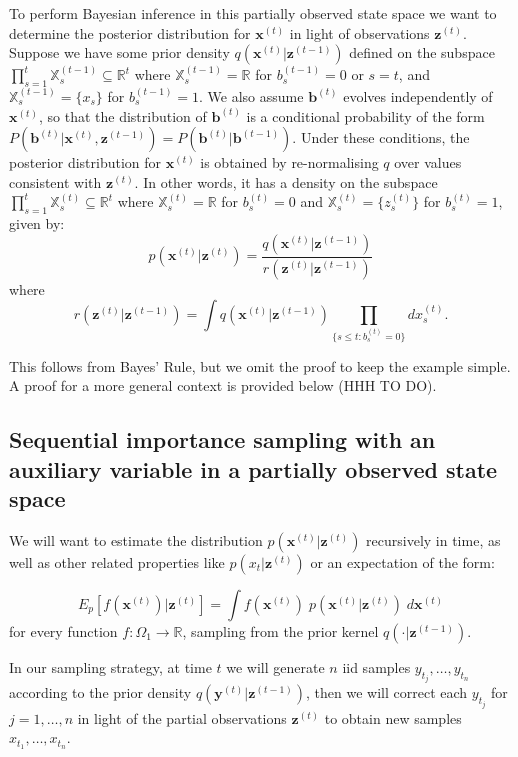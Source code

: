 \documentclass[11pt,a4paper]{article}
\newcommand{\Real}{\mathbb R}
\renewcommand{\vec}[1]{\mathbf{#1}}
\begin{document}
To perform Bayesian inference in this partially observed state space we want to determine the posterior distribution for $\vec{x}^{(t)}$ in light of observations $\vec{z}^{(t)}$. Suppose we have some prior density $q(\vec{x}^{(t)}|\vec{z}^{(t-1)})$ defined on the subspace $\prod_{s=1}^t \mathbb{X}_s^{(t-1)} \subseteq \mathbb{R}^t$ where $\mathbb{X}_s^{(t-1)} = \mathbb{R}$ for $b_s^{(t-1)} = 0$ or $s=t$, and $\mathbb{X}_s^{(t-1)} = \{ x_s \}$ for $b_s^{(t-1)} = 1$. We also assume $\vec{b}^{(t)}$ evolves independently of $\vec{x}^{(t)}$, so that the distribution of $\vec{b}^{(t)}$ is a conditional probability of the form $P( \vec{b}^{(t)} | \vec{x}^{(t)}, \vec{z}^{(t-1)} ) = P( \vec{b}^{(t)} | \vec{b}^{(t-1)} )$. Under these conditions, the posterior distribution for $\vec{x}^{(t)}$ is obtained by re-normalising $q$ over values consistent with $\vec{z}^{(t)}$. In other words, it has a density on the subspace $\prod_{s=1}^t \mathbb{X}_s^{(t)} \subseteq \mathbb{R}^t$ where $\mathbb{X}_s^{(t)} = \mathbb{R}$ for $b_s^{(t)} = 0$ and $\mathbb{X}_s^{(t)} = \{ z_s^{(t)}\}$ for $b_s^{(t)} = 1$, given by:
\[
p(\vec{x}^{(t)} | \vec{z}^{(t)})  =   
\frac{ q(\vec{x}^{(t)}|\vec{z}^{(t-1)})} {r(\vec{z}^{(t)} | \vec{z}^{(t-1)})}
\]
where 
\[
r(\vec{z}^{(t)} | \vec{z}^{(t-1)}) = \int q(\vec{x}^{(t)}|\vec{z}^{(t-1)}) \prod_{\{s \leq t: b_s^{(t)} = 0\}} dx_s^{(t)}.
\]

This follows from Bayes' Rule, but we omit the proof to keep the example simple. A proof for a more general context is provided below (HHH TO DO).

\subsection{Sequential importance sampling with an auxiliary variable in a partially observed state space}

We will want to estimate the distribution $p(\vec{x}^{(t)} | \vec{z}^{(t)})$ recursively in time, as well as other related properties like $p(x_{t} | \vec{z}^{(t)})$ or an expectation of the form:

\[
E_{p}[f(\vec{x}^{(t)}) | \vec{z}^{(t)}] = \int f(\vec{x}^{(t)})\; p(\vec{x}^{(t)} | \vec{z}^{(t)})\; d\vec{x}^{(t)}
\]
for every function $f: \Omega_1 \rightarrow \Real$, sampling from the prior kernel $q( \cdot | \vec{z}^{(t-1)})$.

In our sampling strategy, at time $t$ we will generate $n$ iid samples $y_{t_j}, \dots, y_{t_n}$ according to the prior density $q(\vec{y}^{(t)} | \vec{z}^{(t-1)})$, then we will correct each $y_{t_j}$ for $j = 1, \dots, n$ in light of the partial observations $\vec{z}^{(t)}$ to obtain new samples $x_{t_1}, \dots, x_{t_n}$.
\end{document}

